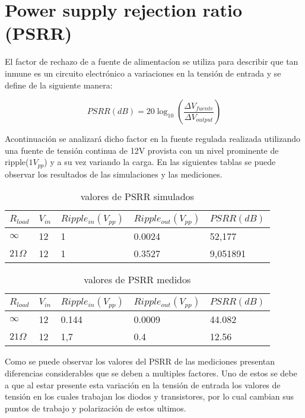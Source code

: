 \documentclass[e2_tp1_main.tex]{subfiles}
\begin{document}
\section{Power supply rejection ratio (PSRR)}

El factor de rechazo de a fuente de alimentacíon se utiliza para describir que tan inmune es un circuito electrónico a variaciones en la tensión de entrada y se define de la siguiente manera:

\begin{equation}
 PSRR(dB) = 20\log_{10}{(\frac{\Delta V_{fuente}}{\Delta V_{output}})} 
\end{equation}

Acontinuación se analizará dicho factor en la fuente regulada realizada utilizando una fuente de tensión continua de 12V provista con un nivel prominente de ripple($1V_{pp}$) y a su vez variando la carga.
En las siguientes tablas se puede observar los resultados de las simulaciones y las mediciones.


\begin{table}[ht!]
\centering
\begin{tabular}{lllll}
\hline
$R_{load}$ & $V_{in}$ & $Ripple _{in} (V_{pp})$ & $Ripple_{out} (V_{pp})$ & $PSRR(dB)$ \\ \hline
$\infty$ & 12 & 1 & 0.0024 & 52,177 \\
$21\Omega$ & 12 & 1 & 0.3527 & 9,051891
\end{tabular}
\caption{valores de PSRR simulados}
\label{table:psrr}
\end{table}


\begin{table}[ht!]
\centering
\begin{tabular}{lllll}
\hline
$R_{load}$ & $V_{in}$ & $Ripple _{in} (V_{pp})$ & $Ripple_{out} (V_{pp})$ & $PSRR(dB)$ \\ \hline
$\infty$ & 12 & 0.144 & 0.0009 & 44.082 \\
$21\Omega$ & 12 & 1,7 & 0.4 & 12.56
\end{tabular}
\caption{valores de PSRR medidos}
\label{table:psrr2}
\end{table}

Como se puede observar los valores del PSRR de las mediciones presentan diferencias considerables  
que se deben a multiples factores. Uno de estos se debe a que al estar presente esta variación en la tensión de entrada los valores de tensión en los cuales trabajan los diodos y transistores, por lo cual cambian sus puntos de trabajo y polarización de estos ultimos.



 
\end{document}
